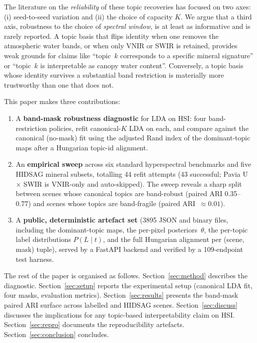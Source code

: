 \documentclass[conference,a4paper,10pt]{IEEEtran}
\begin{document}
The literature on the \emph{reliability} of these topic recoveries
has focused on two axes: (i) seed-to-seed variation
\cite{griffiths2004finding} and (ii) the choice of capacity $K$.
We argue that a third axis, robustness to the choice of
\emph{spectral window}, is at least as informative and is rarely
reported. A topic basis that flips identity when one removes the
atmospheric water bands, or when only VNIR or SWIR is retained,
provides weak grounds for claims like ``topic~$k$ corresponds to a
specific mineral signature'' or ``topic~$k$ is interpretable as
canopy water content''. Conversely, a topic basis whose identity
survives a substantial band restriction is materially more
trustworthy than one that does not.

This paper makes three contributions:

\begin{enumerate}
\item A \textbf{band-mask robustness diagnostic} for LDA on HSI:
four band-restriction policies, refit canonical-$K$ LDA on each, and
compare against the canonical (no-mask) fit using the adjusted Rand
index of the dominant-topic maps after a Hungarian topic-id
alignment.

\item An \textbf{empirical sweep} across six standard hyperspectral
benchmarks and five HIDSAG mineral subsets, totalling 44 refit
attempts (43 successful; Pavia U $\times$ SWIR is VNIR-only and
auto-skipped).
The sweep reveals a sharp split between scenes whose canonical
topics are band-robust (paired ARI 0.35--0.77) and scenes whose
topics are band-fragile (paired ARI~$\approx 0.01$).

\item A \textbf{public, deterministic artefact set} (3895 JSON and
binary files, including the dominant-topic maps, the per-pixel
posteriors~$\theta$, the per-topic label distributions
$P(L \mid t)$, and the full Hungarian alignment per (scene, mask)
tuple), served by a FastAPI backend and verified by a
109-endpoint test harness.
\end{enumerate}

The rest of the paper is organised as follows. Section~\ref{sec:method}
describes the diagnostic. Section~\ref{sec:setup} reports the
experimental setup (canonical LDA fit, four masks, evaluation
metrics). Section~\ref{sec:results} presents the band-mask paired
ARI surface across labelled and HIDSAG scenes. Section~\ref{sec:discuss}
discusses the implications for any topic-based interpretability claim
on HSI. Section~\ref{sec:repro} documents the reproducibility
artefacts. Section~\ref{sec:conclusion} concludes.
\end{document}
